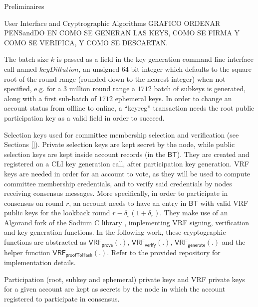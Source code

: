 \documentclass[10pt,a4paper]{article}
\begin{document}
\begin{section}{Preliminaires}
\begin{subsection}{User Interface and Cryptrographic Algorithms}
     GRAFICO ORDENAR PENSandDO EN COMO SE GENERAN LAS KEYS, COMO SE FIRMA Y COMO SE VERIFICA, Y COMO SE DESCARTAN.

    The batch size $k$ is passed as a field in the key generation command line interface call named 
    $keyDillution$, an unsigned 64-bit integer which defaults to the square root of the round range 
    (rounded down to the nearest integer) when not specified, e.g. for a 3 million round range a $1712$ 
    batch of subkeys is generated,  along with a first sub-batch of $1712$ ephemeral keys.
    In order to change an account status from offline to online, a ``keyreg'' transaction needs the 
    root public participation key as a valid field in order to succeed.


Selection keys used for committee membership selection and verification (see Sections \ref{}).
Private selection keys are kept secret by the node, while public selection keys are kept inside 
account records (in the $\mathsf{BT}$).
They are created and registered on a CLI key generation call, after participation key generation.
VRF keys are needed in order for an account to vote, as they will be
used to compute committee membership credentials, and to verify said credentials by nodes receiving consensus messages.
More specifically, in order to participate in consensus on round $r$, an account needs to have an entry in $\mathsf{BT}$
with valid VRF public keys for the lookback round $r-\delta_s(1+\delta_r)$.
They make use of an Algorand fork of the Sodium C library , implementing VRF signing, verification and
key generation functions.
    In the following work, these cryptographic functions are abstracted as $\mathsf{VRF_{prove}}(.)$, $\mathsf{VRF_{verify}}(.)$, $\mathsf{VRF_{generate}}(.)$
    and the helper function $\mathsf{VRF_{proofToHash}}(.)$.
    Refer to the provided repository for implementation details.

    Participation (root, subkey and ephemeral) private keys and VRF private keys for a given account are kept as secrets by the node
    in which the account registered to participate in consensus.



\end{subsection}
\end{section}
\end{document}
